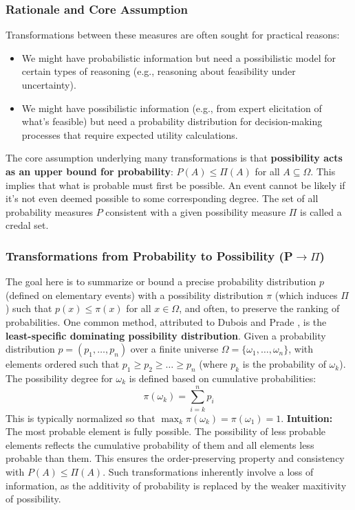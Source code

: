 \subsubsection{Rationale and Core Assumption}
Transformations between these measures are often sought for practical reasons:
\begin{itemize}
    \item We might have probabilistic information but need a possibilistic model for certain types of reasoning (e.g., reasoning about feasibility under uncertainty).
    \item We might have possibilistic information (e.g., from expert elicitation of what's feasible) but need a probability distribution for decision-making processes that require expected utility calculations.
\end{itemize}
The core assumption underlying many transformations is that \textbf{possibility acts as an upper bound for probability}: $P(A) \le \Pi(A)$ for all $A \subseteq \Omega$. This implies that what is probable must first be possible. An event cannot be likely if it's not even deemed possible to some corresponding degree. The set of all probability measures $P$ consistent with a given possibility measure $\Pi$ is called a credal set.

\subsubsection{Transformations from Probability to Possibility (P$\to\Pi$)}
The goal here is to summarize or bound a precise probability distribution $p$ (defined on elementary events) with a possibility distribution $\pi$ (which induces $\Pi$) such that $p(x) \le \pi(x)$ for all $x \in \Omega$, and often, to preserve the ranking of probabilities.
One common method, attributed to Dubois and Prade \cite{Dubois1997}, is the \textbf{least-specific dominating possibility distribution}.
Given a probability distribution $p=(p_1, \dots, p_n)$ over a finite universe $\Omega = \{\omega_1, \dots, \omega_n\}$, with elements ordered such that $p_1 \ge p_2 \ge \dots \ge p_n$ (where $p_k$ is the probability of $\omega_k$). The possibility degree for $\omega_k$ is defined based on cumulative probabilities:
\[ \pi(\omega_k) = \sum_{i=k}^{n} p_i \]
This is typically normalized so that $\max_k \pi(\omega_k) = \pi(\omega_1) = 1$.
\textbf{Intuition:} The most probable element is fully possible. The possibility of less probable elements reflects the cumulative probability of them and all elements less probable than them. This ensures the order-preserving property and consistency with $P(A) \le \Pi(A)$. Such transformations inherently involve a loss of information, as the additivity of probability is replaced by the weaker maxitivity of possibility.

